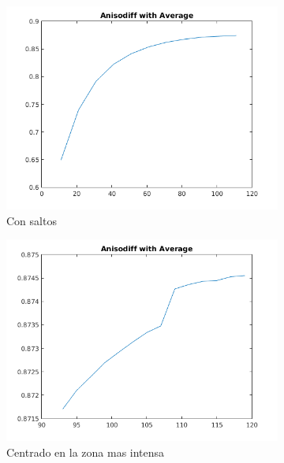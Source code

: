 \begin{figure}[H]
	\centering
	\begin{subfigure}[b]{0.48\textwidth}
        \includegraphics[width=1\textwidth]{./Figures/Results/anisodiffWithAverageJump.png}
        \caption{Con saltos}
        \label{fig:thermalforanisodiffwithmediana}
  \end{subfigure}
  \begin{subfigure}[b]{0.48\textwidth}
        \includegraphics[width=1\textwidth]{./Figures/Results/anisodiffWithAverageCentrado.png}
        \caption{Centrado en la zona mas intensa}
        \label{fig:thermalforanisodiffwithmedianacentered}
  \end{subfigure}
  \begin{subfigure}[b]{0.48\textwidth}

\end{subfigure}
\end{figure}
